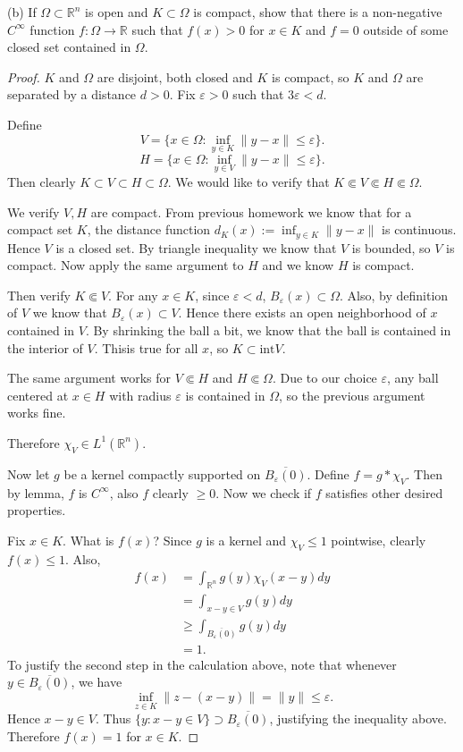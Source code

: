 (b) If $\Omega \subset \mathbb{R}^{n}$ is open and $K \subset \Omega$ is compact, show that there is a non-negative $C^{\infty}$ function $f: \Omega \rightarrow \mathbb{R}$ such that $f(x)>0$ for $x \in K$ and $f=0$ outside of some closed set contained in $\Omega$.

\begin{proof}
	$K$ and $\Omega$ are disjoint, both closed and $K$ is compact, so $K$ and $\Omega$ are separated by a distance $d>0$. Fix $\varepsilon>0$ such that $3 \varepsilon < d$. 

	Define
	\[
		V = \{x \in \Omega: \inf_{y \in K} \|y - x\| \le \varepsilon\} 
	.\] 
	\[
		H = \{x \in \Omega: \inf _{y \in V} \|y - x\|\le \varepsilon\} 
	.\] 
	Then clearly $K \subset V \subset H \subset \Omega$. We would like to verify that $K \Subset V \Subset H \Subset \Omega$.

	We verify $V, H$ are compact. From previous homework we know that for a compact set $K$, the distance function $d_K(x):= \inf _{y \in K}\| y - x\|$ is continuous. Hence $V$ is a closed set. By triangle inequality we know that $V$ is bounded, so $V$ is compact. Now apply the same argument to $H$ and we know $H$ is compact.

	Then verify $K \Subset V$. For any $x \in K$, since $\varepsilon < d$, $B_\varepsilon(x) \subset \Omega$. Also, by definition of $V$ we know that $B_\varepsilon(x) \subset V$. Hence there exists an open neighborhood of $x$ contained in $V$. By shrinking the ball a bit, we know that the ball is contained in the interior of $V$. Thisis true for all $x$, so $K \subset \text{int} V$.

	The same argument works for $V \Subset H$ and $H \Subset \Omega$. Due to our choice $\varepsilon$, any ball centered at $x \in H$ with radius $\varepsilon$ is contained in $\Omega$, so the previous argument works fine.

	Therefore $\chi_{V} \in L^1(\mathbb{R}^n)$.

	Now let  $g$ be a kernel compactly supported on $\overline{B_\varepsilon(0)}$. Define $f = g * \chi_V$. Then by lemma, $f$ is $C^ \infty $, also $f$ clearly $\ge 0$. Now we check if $f$ satisfies other desired properties.

	Fix $x \in K$. What is $f(x)$? Since $g$ is a kernel and $\chi_V \le 1$ pointwise, clearly $f(x) \le 1$. Also,
	\begin{align*}
		f(x) 
		&= \int_{\mathbb{R}^n } g(y) \chi_V(x -y) d y \\
		&= \int _{x - y \in V} g\left( y \right) d y \\
		&\ge \int_{\overline{B_\varepsilon(0)}} g(y) d y \\
		&= 1 
	.\end{align*}
	To justify the second step in the calculation above, note that whenever $y \in \overline{B_\varepsilon(0)} $, we have 
	\[
		\inf_{z \in K} \|z - (x - y)\| = \|y\| \le \varepsilon
	.\] 
	Hence $x -y \in V$. Thus $\{y: x - y \in V\} \supset \overline{B_\varepsilon(0)} $, justifying the inequality above. Therefore $f(x) = 1$ for $x \in K$.


\end{proof}
